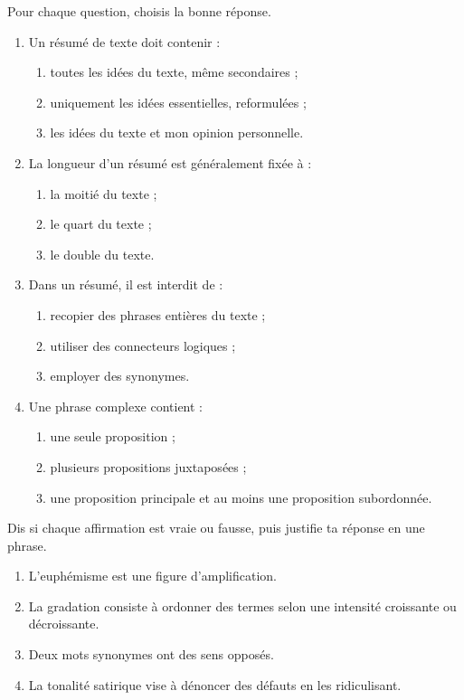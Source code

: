 \documentclass[11pt]{article}
\begin{document}
\begin{exercice}
Pour chaque question, choisis la bonne réponse.
\begin{enumerate}
\item Un résumé de texte doit contenir :
\begin{enumerate}
\item toutes les idées du texte, même secondaires ;
\item uniquement les idées essentielles, reformulées ;
\item les idées du texte et mon opinion personnelle.
\end{enumerate}
\item La longueur d'un résumé est généralement fixée à :
\begin{enumerate}
\item la moitié du texte ;
\item le quart du texte ;
\item le double du texte.
\end{enumerate}
\item Dans un résumé, il est interdit de :
\begin{enumerate}
\item recopier des phrases entières du texte ;
\item utiliser des connecteurs logiques ;
\item employer des synonymes.
\end{enumerate}
\item Une phrase complexe contient :
\begin{enumerate}
\item une seule proposition ;
\item plusieurs propositions juxtaposées ;
\item une proposition principale et au moins une proposition subordonnée.
\end{enumerate}
\end{enumerate}
\end{exercice}

\begin{exercice}
Dis si chaque affirmation est vraie ou fausse, puis justifie ta réponse en une phrase.
\begin{enumerate}
\item L'euphémisme est une figure d'amplification.
\item La gradation consiste à ordonner des termes selon une intensité croissante ou décroissante.
\item Deux mots synonymes ont des sens opposés.
\item La tonalité satirique vise à dénoncer des défauts en les ridiculisant.
\end{enumerate}
\end{exercice}
\end{document}
